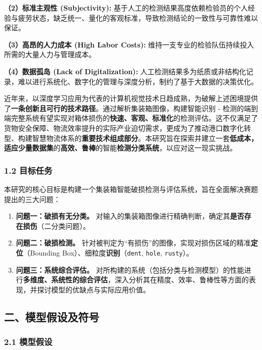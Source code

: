 \documentclass[
]{article}
\begin{document}
\textbf{（2）标准主观性 (Subjectivity):}
基于人工的检测结果高度依赖检验员的个人经验与疲劳状态，缺乏统一、量化的客观标准，导致检测结论的一致性与可靠性难以保证。

\textbf{（3）高昂的人力成本 (High Labor Costs):}
维持一支专业的检验队伍持续投入所需的大量人力与管理成本。

\textbf{（4）数据孤岛 (Lack of Digitalization):}
人工检测结果多为纸质或非结构化记录，难以进行系统化、数字化的管理与深度分析，制约了基于大数据的决策优化。

近年来，以深度学习应用为代表的计算机视觉技术日趋成熟，为破解上述困境提供了\textbf{一条创新且可行的技术路径}。通过解析集装箱图像，构建智能识别
-
检测的端到端完整系统有望实现对箱体损伤的\textbf{快速、客观、标准化}的检测评估。这不仅满足了货物安全保障、物流效率提升的实际产业迫切需求，更成为了推动港口数字化转型、构建智慧物流体系的\textbf{重要技术组成部分}。本研究旨在探索并建立一套\textbf{低成本，适应少量数据集}的\textbf{高效、鲁棒}的智能\textbf{检测分类系统}，以应对这一现实挑战。

\subsubsection{1.2 目标任务}\label{12-ux76eeux6807ux4efbux52a1}

本研究的核心目标是构建一个集装箱智能破损检测与评估系统，旨在全面解决赛题提出的三大问题：

\begin{enumerate}
\def\labelenumi{\arabic{enumi}.}
\item
  \textbf{问题一：破损有无分类。}
  对输入的集装箱图像进行精确判断，确定其\textbf{是否存在损伤}（二分类问题）。
\item
  \textbf{问题二：破损检测。}
  针对被判定为``有损伤''的图像，实现对损伤区域的精准\textbf{定位}（Bounding
  Box）、细粒度\textbf{识别}（\texttt{dent}, \texttt{hole},
  \texttt{rusty}）。
\item
  \textbf{问题三：系统综合评估。}
  对所构建的系统（包括分类与检测模型）的性能进行\textbf{多维度、系统性的综合评估}，深入分析其在精度、效率、鲁棒性等方面的表现，并探讨模型的优缺点与实际应用价值。
\end{enumerate}

\subsection{二、模型假设及符号}\label{ux4e8cux6a21ux578bux5047ux8bbeux53caux7b26ux53f7}

\subsubsection{2.1 模型假设}\label{21-ux6a21ux578bux5047ux8bbe}
\end{document}
